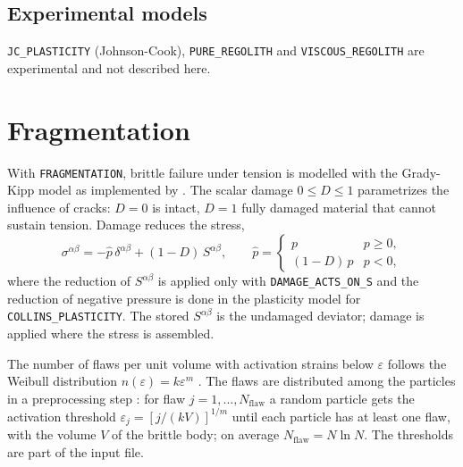 \documentclass[10pt,fleqn,twoside]{article}
\newcommand{\sw}[1]{\texttt{#1}}
\begin{document}
\subsection{Experimental models}
\sw{JC\_PLASTICITY} (Johnson-Cook), \sw{PURE\_REGOLITH} \citep{bui2008} and \sw{VISCOUS\_REGOLITH} are
experimental and not described here.


\section{Fragmentation}
\label{sec:damage}

With \sw{FRAGMENTATION}, brittle failure under tension is modelled with the Grady-Kipp model \citep{grady:1980} as
implemented by \citet{benz:1995}. The scalar damage $0 \leq D \leq 1$ parametrizes the influence of cracks:
$D = 0$ is intact, $D = 1$ fully damaged material that cannot sustain tension. Damage reduces the stress,
\begin{equation}
 \sigma^{\alpha\beta} = -\hat p\,\delta^{\alpha\beta} + (1-D)\,S^{\alpha\beta},\qquad
 \hat p = \begin{cases} p & p \geq 0,\\ (1-D)\,p & p < 0,\end{cases}
\end{equation}
where the reduction of $S^{\alpha\beta}$ is applied only with \sw{DAMAGE\_ACTS\_ON\_S} and the reduction of negative
pressure is done in the plasticity model for \sw{COLLINS\_PLASTICITY}. The stored $S^{\alpha\beta}$ is the undamaged
deviator; damage is applied where the stress is assembled.

The number of flaws per unit volume with activation strains below $\varepsilon$ follows the Weibull distribution
$n(\varepsilon) = k\varepsilon^m$ \citep{weibull:1939}. The flaws are distributed among the particles in a
preprocessing step \citep{benz:1995}: for flaw $j = 1, \ldots, N_\mathrm{flaw}$ a random particle gets the activation
threshold $\varepsilon_j = [j/(kV)]^{1/m}$ until each particle has at least one flaw, with the volume $V$ of the
brittle body; on average $N_\mathrm{flaw} = N\ln N$. The thresholds are part of the input file.
\end{document}
